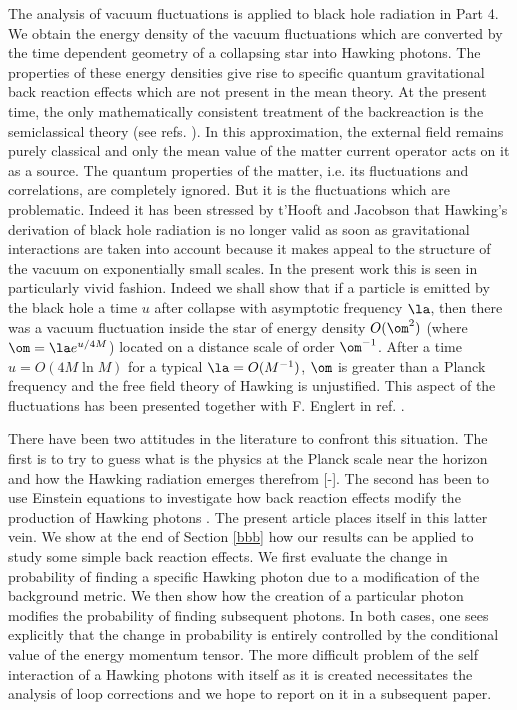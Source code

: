 \documentclass[12pt]{article}
\begin{document}
The
analysis of vacuum fluctuations is applied to  black
hole radiation in Part 4.
We obtain
the energy density of the
vacuum fluctuations which are converted by the time dependent geometry of a
collapsing star into Hawking photons.
The properties of these energy densities give rise to specific
quantum gravitational back reaction effects which are not present in the mean
theory.
At the present time, the only mathematically consistent
treatment  of the backreaction is the semiclassical theory (see refs.
\cite{Bardeen,PT,Massar2}).
In this approximation,
the external field remains purely classical and only
the mean value of the matter current operator acts on it as a source.
The quantum
properties of the matter, i.e. its fluctuations and correlations, are
completely ignored.
But it is the fluctuations which are problematic. Indeed it has been stressed
by t'Hooft\cite{THooft} and Jacobson \cite{Jacobson} that Hawking's
derivation of black hole
radiation is no longer valid
as soon as gravitational interactions are taken into
account because it makes appeal to the structure of the vacuum on exponentially
small scales.
In the present work this is seen in
particularly vivid fashion. Indeed we shall show that if a particle is emitted
by the black hole a time $u$ after collapse
with
asymptotic
frequency $\la$, then there
was a vacuum fluctuation inside the star of energy density $O(\om^2)$
(where $\om=\la e^{u/4M}$) located on a distance scale of order
$\om^{-1}$.
After a time $u=O(4M \ln M)$ for a typical
$\la=O(M^{-1})$, $\om$ is greater than a Planck frequency and the free field
theory of Hawking is unjustified. This aspect of the fluctuations
has been
presented
together with F.
Englert in ref. \cite{EMP}.

There have been two attitudes in the literature to confront this situation.
The first is to try to guess what is the physics at the Planck
scale near the horizon and how the Hawking radiation emerges therefrom
[-].
The second has been to use Einstein equations to
investigate how back reaction effects modify the production of Hawking
photons \cite{Verlinde,Wilceck}.
The present
article places itself in this latter vein. We  show at the end of
Section \ref{bbb} how our results can be applied to study some simple back
reaction effects.  We first evaluate the change in
probability of finding a specific Hawking photon due to a modification of the
background metric.
We then show how the creation of a particular photon modifies
the probability of finding subsequent photons.
In both cases,
one sees explicitly that the change in probability is entirely
controlled
by
the conditional value
of the energy
momentum tensor.
The more difficult problem of
the self interaction of a Hawking photons with itself as it is created
necessitates the analysis of loop corrections and we hope to report on it in a
subsequent paper.
\end{document}
